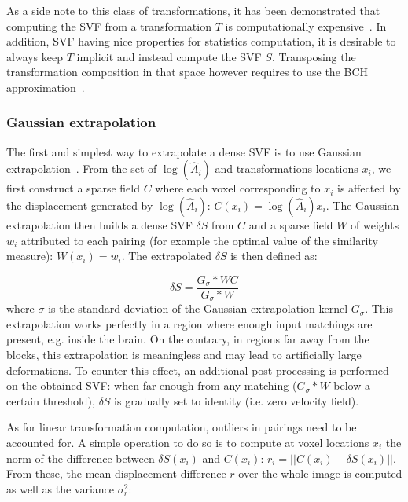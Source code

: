 \documentclass[a4paper]{article}
\begin{document}
As a side note to this class of transformations, it has been demonstrated that computing the SVF from a transformation $T$ is computationally expensive~\cite{arsigny:inria-00615594}. In addition, SVF having nice properties for statistics computation, it is desirable to always keep $T$ implicit and instead compute the SVF $S$. Transposing the transformation composition in that space however requires to use the BCH approximation~\cite{Bossa_Miccai_2007,Vercauteren_Miccai_2008}.

\subsubsection{Gaussian extrapolation} %
\label{ssub:gaussian_extrapolation}

The first and simplest way to extrapolate a dense SVF is to use Gaussian extrapolation~\cite{commowick:tel-00133432,garcia:inria-00616148}. From the set of $\log(\hat{A}_i)$ and transformations locations $x_i$, we first construct a sparse field $C$ where each voxel corresponding to $x_i$ is affected by the displacement generated by $\log(\hat{A}_i)$: $C(x_i) = \log(\hat{A}_i) x_i$. The Gaussian extrapolation then builds a dense SVF $\delta S$ from $C$ and a sparse field $W$ of weights $w_i$ attributed to each pairing (for example the optimal value of the similarity measure): $W(x_i) = w_i$. The extrapolated $\delta S$ is then defined as:

\begin{equation}
	\delta S = \frac{G_\sigma * W C}{G_\sigma * W}
\end{equation}
where $\sigma$ is the standard deviation of the Gaussian extrapolation kernel $G_\sigma$. This extrapolation works perfectly in a region where enough input matchings are present, e.g. inside the brain. On the contrary, in regions far away from the blocks, this extrapolation is meaningless and may lead to artificially large deformations. To counter this effect, an additional post-processing is performed on the obtained SVF: when far enough from any matching ($G_\sigma * W$ below a certain threshold), $\delta S$ is gradually set to identity (i.e. zero velocity field).

As for linear transformation computation, outliers in pairings need to be accounted for. A simple operation to do so is to compute at voxel locations $x_i$ the norm of the difference between $\delta S(x_i)$ and $C(x_i)$: $r_i = || C(x_i) - \delta S(x_i) ||$. From these, the mean displacement difference $r$ over the whole image is computed as well as the variance $\sigma_r^2$:
\end{document}
